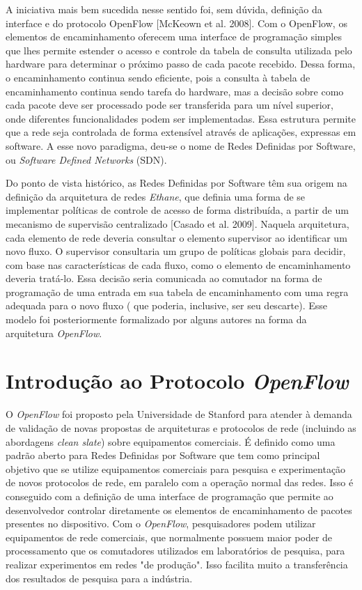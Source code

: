 A iniciativa mais bem sucedida nesse sentido foi, sem dúvida,
definição da interface e do protocolo OpenFlow [McKeown et al.
2008]. Com o OpenFlow, os elementos de encaminhamento 
oferecem uma interface de programação simples que lhes
permite estender o acesso e controle da tabela de consulta 
utilizada pelo hardware para determinar o próximo passo de 
cada pacote recebido. Dessa forma, o encaminhamento continua 
sendo eficiente, pois a consulta à tabela de encaminhamento 
continua sendo tarefa do hardware, mas a decisão sobre 
como cada pacote deve ser processado pode ser transferida
para um nível superior, onde diferentes funcionalidades 
podem ser implementadas. Essa estrutura permite que a rede
seja controlada de forma extensível através de aplicações,
expressas em software. A esse novo paradigma, deu-se o 
nome de Redes Definidas por Software, ou \textit{Software
Defined Networks} (SDN).

Do ponto de vista histórico, as Redes Definidas por 
Software têm sua origem na definição
da arquitetura de redes \textit{Ethane}, que definia uma forma
de se implementar políticas de controle de acesso de forma 
distribuída, a partir de um mecanismo de supervisão centralizado
[Casado et al. 2009]. Naquela arquitetura, cada elemento de 
rede deveria consultar o elemento supervisor ao identificar um
novo fluxo. O supervisor consultaria um grupo de políticas 
globais para decidir, com base nas características de cada
fluxo, como o elemento de encaminhamento deveria 
tratá-lo. Essa decisão seria comunicada ao comutador na 
forma de programação de uma entrada em sua tabela de
encaminhamento com uma regra adequada para o novo fluxo (
que poderia, inclusive, ser seu descarte). Esse modelo foi
posteriormente formalizado por alguns autores na forma da 
arquitetura \textit{OpenFlow}.

\section{Introdução ao Protocolo \textit{OpenFlow}}

O \textit{OpenFlow} foi proposto pela Universidade de
Stanford para atender à demanda de validação de novas
propostas de arquiteturas e protocolos de rede (incluindo as
abordagens \textit{clean slate}) sobre equipamentos
comerciais. É definido como uma padrão aberto para Redes
Definidas por Software que tem como principal objetivo que 
se utilize equipamentos comerciais para pesquisa e 
experimentação de novos protocolos de rede, em paralelo
com a operação normal das redes. Isso é conseguido com a 
definição de uma interface de programação que permite 
ao desenvolvedor controlar diretamente os elementos de 
encaminhamento de pacotes presentes no dispositivo. Com o 
\textit{OpenFlow}, pesquisadores podem utilizar equipamentos de 
rede comerciais, que normalmente possuem maior poder 
de processamento que os comutadores utilizados em 
laboratórios de pesquisa, para realizar experimentos em redes
"de produção". Isso facilita muito a transferência dos resultados
de pesquisa para a indústria. 

